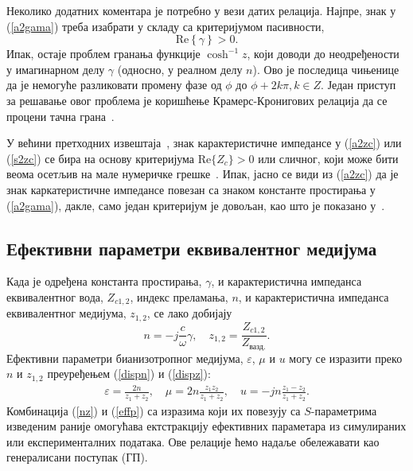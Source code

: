 Неколико додатних коментара је потребно у вези датих релација. Најпре, знак у (\ref{a2gama}) треба изабрати у складу са критеријумом пасивности, 
\begin{equation}\label{pasivnost}
\mathrm{Re}\left\lbrace\gamma\right\rbrace > 0.
\end{equation}
Ипак, остаје проблем гранања функције $\cosh^{-1}{z}$, који доводи до неодређености у имагинарном делу $\gamma$ (односно, у реалном делу $n$). Ово је последица чињенице да је немогуће разликовати промену фазе од $\phi$ до $\phi + 2k\pi, k\in Z$. Један приступ за решавање овог проблема је коришћење Крамерс-Кронигових релација да се процени тачна грана~\cite{Szabo:10}.

У већини претходних извештаја~\cite{Nicol:70, Weir:74, Smith:02, Markos:03, Mao:05}, знак карактеристичне импедансе у (\ref{a2zc}) или (\ref{s2zc}) се бира на основу критеријума $\mathrm{Re}\{Z_c\}>0$ или сличног, који може бити веома осетљив на мале нумеричке грешке~\cite{Chen:04}. Ипак, јасно се види из (\ref{a2zc}) да је знак каркатеристичне импедансе повезан са знаком константе простирања у (\ref{a2gama}), дакле, само један критеријум је довољан, као што је показано у~\cite{Chen:04}.

\subsection{Ефективни параметри еквивалентног медијума}
Када је одређена константа простирања, $\gamma$, и карактеристична импеданса еквивалентног вода, $Z_{c1,2}$, индекс преламања, $n$, и карактеристична импеданса еквивалентног медијума, $z_{1,2}$, се лако добијају
\begin{equation}\label{nz}
n = -j\frac{c}{\omega}\gamma,\quad z_{1,2}=\frac{Z_{c1,2}}{Z_{вазд.}}.
\end{equation}
Ефективни параметри бианизотропног медијума, $\varepsilon$, $\mu$ и $u$ могу се изразити преко $n$ и $z_{1,2}$ преуређењем (\ref{dispn}) и (\ref{dispz}):
\begin{equation}\label{effp}
\begin{split}
	\varepsilon = \frac{2n}{z_1+z_2},\quad
	\mu = 2n\frac{z_1z_2}{z_1+z_2},\quad
	u = -jn\frac{z_1-z_2}{z_1+z_2}.
\end{split}
\end{equation}
Комбинација (\ref{nz}) и (\ref{effp}) са изразима који их повезују са $S$-параметрима изведеним раније омогућава ектстракцију ефективних параметара из симулираних или експерименталних података. Ове релације ћемо надаље обележавати као генералисани поступак ($ГП$).

